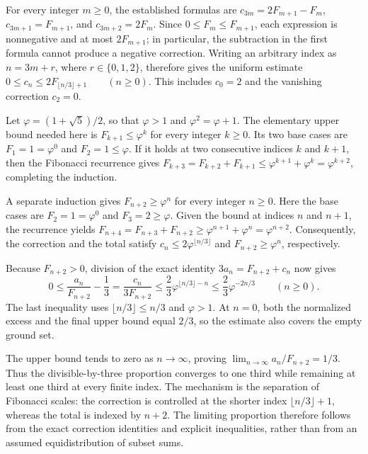 \documentclass[11pt]{article}
\begin{document}
For every integer $m\geq 0$, the established formulas are $c_{3m}=2F_{m+1}-F_m$, $c_{3m+1}=F_{m+1}$, and $c_{3m+2}=2F_m$. Since $0\leq F_m\leq F_{m+1}$, each expression is nonnegative and at most $2F_{m+1}$; in particular, the subtraction in the first formula cannot produce a negative correction. Writing an arbitrary index as $n=3m+r$, where $r\in\{0,1,2\}$, therefore gives the uniform estimate
$0\leq c_n\leq 2F_{\lfloor n/3\rfloor+1}\qquad(n\geq 0).$
This includes $c_0=2$ and the vanishing correction $c_2=0$.

Let $\varphi=(1+\sqrt{5})/2$, so that $\varphi>1$ and $\varphi^2=\varphi+1$. The elementary upper bound needed here is $F_{k+1}\leq\varphi^k$ for every integer $k\geq 0$. Its two base cases are $F_1=1=\varphi^0$ and $F_2=1\leq\varphi$. If it holds at two consecutive indices $k$ and $k+1$, then the Fibonacci recurrence gives $F_{k+3}=F_{k+2}+F_{k+1}\leq\varphi^{k+1}+\varphi^k=\varphi^{k+2}$, completing the induction.

A separate induction gives $F_{n+2}\geq\varphi^n$ for every integer $n\geq 0$. Here the base cases are $F_2=1=\varphi^0$ and $F_3=2\geq\varphi$. Given the bound at indices $n$ and $n+1$, the recurrence yields $F_{n+4}=F_{n+3}+F_{n+2}\geq\varphi^{n+1}+\varphi^n=\varphi^{n+2}$. Consequently, the correction and the total satisfy $c_n\leq 2\varphi^{\lfloor n/3\rfloor}$ and $F_{n+2}\geq\varphi^n$, respectively.

Because $F_{n+2}>0$, division of the exact identity $3a_n=F_{n+2}+c_n$ now gives
\[0\leq\frac{a_n}{F_{n+2}}-\frac13=\frac{c_n}{3F_{n+2}}\leq\frac23\varphi^{\lfloor n/3\rfloor-n}\leq\frac23\varphi^{-2n/3}\qquad(n\geq 0).\]
The last inequality uses $\lfloor n/3\rfloor\leq n/3$ and $\varphi>1$. At $n=0$, both the normalized excess and the final upper bound equal $2/3$, so the estimate also covers the empty ground set.

The upper bound tends to zero as $n\to\infty$, proving $\lim_{n\to\infty}a_n/F_{n+2}=1/3$. Thus the divisible-by-three proportion converges to one third while remaining at least one third at every finite index. The mechanism is the separation of Fibonacci scales: the correction is controlled at the shorter index $\lfloor n/3\rfloor+1$, whereas the total is indexed by $n+2$. The limiting proportion therefore follows from the exact correction identities and explicit inequalities, rather than from an assumed equidistribution of subset sums.
\end{document}
